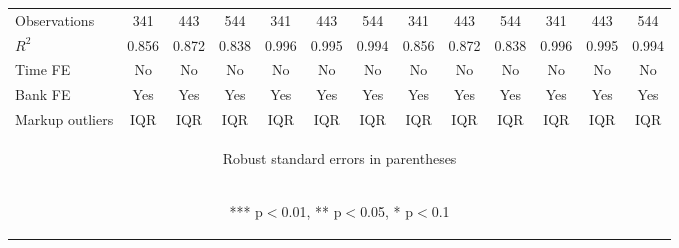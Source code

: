 \documentclass[]{article}
\begin{document}
\begin{center}
\begin{tabular}{lcccccccccccc}
Observations & 341 & 443 & 544 & 341 & 443 & 544 & 341 & 443 & 544 & 341 & 443 & 544 \\
$R^2$ & 0.856 & 0.872 & 0.838 & 0.996 & 0.995 & 0.994 & 0.856 & 0.872 & 0.838 & 0.996 & 0.995 & 0.994 \\
Time FE & No & No & No & No & No & No & No & No & No & No & No & No \\
Bank FE & Yes & Yes & Yes & Yes & Yes & Yes & Yes & Yes & Yes & Yes & Yes & Yes \\
 Markup outliers & IQR & IQR & IQR & IQR & IQR & IQR & IQR & IQR & IQR & IQR & IQR & IQR \\ \hline
\multicolumn{13}{c}{\begin{footnotesize} Robust standard errors in parentheses\end{footnotesize}} \\
\multicolumn{13}{c}{\begin{footnotesize} *** p$<$0.01, ** p$<$0.05, * p$<$0.1\end{footnotesize}} \\
\end{tabular}
\end{center}
\end{document}
